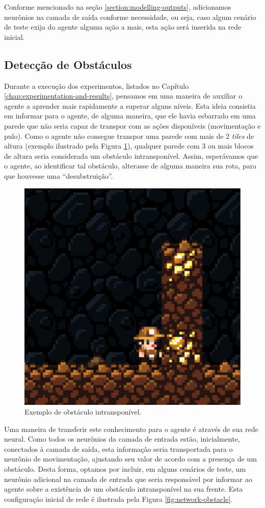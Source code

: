 Conforme mencionado na seção \ref{section:modelling-outputs}, adicionamos
neurônios na camada de saída conforme necessidade, ou seja, caso algum cenário
de teste exija do agente alguma ação a mais, esta ação será inserida na rede
inicial.

\subsection{\label{section:obstacle-input}Detecção de Obstáculos}
Durante a execução dos experimentos, listados no Capítulo
\ref{chap:experimentation-and-results}, pensamos em uma maneira de auxiliar o
agente a aprender mais rapidamente a superar alguns níveis. Esta ideia consistia
em informar para o agente, de alguma maneira, que ele havia esbarrado em uma
parede que não seria capaz de transpor com as ações disponíveis (movimentação e
pulo). Como o agente não consegue transpor uma parede com mais de 2 
\textit{tiles} de altura (exemplo ilustrado pela Figura \ref{fig:obstacle}),
qualquer parede com 3 ou mais blocos de altura seria considerada um obstáculo
intransponível. Assim, esperávamos que o agente, ao identificar tal obstáculo,
alterasse de alguma maneira sua rota, para que houvesse uma ``desubstruição''.

\begin{figure}[htb!]
\centering
\includegraphics[width=.2\textwidth]{fig/obstacle.pdf}
\caption{\label{fig:obstacle}Exemplo de obstáculo intransponível.}
\end{figure}

Uma maneira de transferir este conhecimento para o agente é através de sua rede
neural. Como todos os neurônios da camada de entrada estão, inicialmente,
conectados à camada de saída, esta informação seria transportada para o neurônio
de movimentação, ajustando seu valor de acordo com a presença de um obstáculo.
Desta forma, optamos por incluir, em alguns cenários de teste, um neurônio
adicional na camada de entrada que seria responsável por informar ao agente
sobre a existência de um obstáculo intransponível na sua frente. Esta
configuração inicial de rede é ilustrada pela Figura \ref{fig:network-obstacle}.

